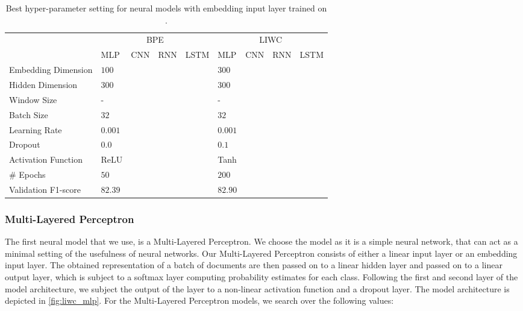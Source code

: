 \begin{landscape}
\begin{table}[]
\centering
\begin{tabular}{lllllllll}
                      & \multicolumn{4}{c}{BPE}               & \multicolumn{4}{c|}{LIWC} \\
                      & MLP     & CNN     & RNN     & LSTM    & MLP     & CNN     & RNN     & LSTM    \\ \hline
Embedding Dimension   & $100$   &         &         &         & $300$   &         &         &         \\
Hidden Dimension      & $300$   &         &         &         & $300$   &         &         &         \\
Window Size           & -       &         &         &         & -       &         &         &         \\
Batch Size            & $32$    &         &         &         & $32$    &         &         &         \\        
Learning Rate         & $0.001$ &         &         &         & $0.001$ &         &         &         \\
Dropout               & $0.0$   &         &         &         & $0.1$   &         &         &         \\
Activation Function   & ReLU    &         &         &         & Tanh    &         &         &         \\
# Epochs              & $50$    &         &         &         & $200$   &         &         &         \\
Validation F1-score   & $82.39$ &         &         &         & $82.90$ &         &         &
\end{tabular}
\caption{Best hyper-parameter setting for neural models with embedding input layer trained on \citet{Wulczyn:2017}.}
\label{tab:redux_hyperparam_search_wulczyn}
\end{table}
\end{landscape}


\subsubsection{Multi-Layered Perceptron}

The first neural model that we use, is a Multi-Layered Perceptron. We choose the model as it is a simple neural network, that can act as a minimal setting of the usefulness of neural networks. Our Multi-Layered Perceptron consists of either a linear input layer or an embedding input layer. The obtained representation of a batch of documents are then passed on to a linear hidden layer and passed on to a linear output layer, which is subject to a softmax layer computing probability estimates for each class. Following the first and second layer of the model architecture, we subject the output of the layer to a non-linear activation function and a dropout layer. The model architecture is depicted in \autoref{fig:liwc_mlp}. For the Multi-Layered Perceptron models, we search over the following values:

